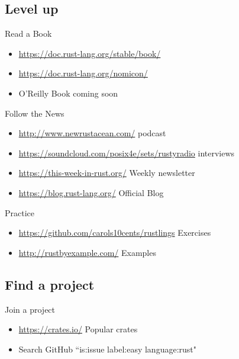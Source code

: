 \documentclass[50pt]{beamer}
\begin{document}
\subsection{Level up}

    \begin{frame}
        Read a Book
        \begin{itemize}
            \item \url{https://doc.rust-lang.org/stable/book/}
            \item \url{https://doc.rust-lang.org/nomicon/}
            \item O'Reilly Book coming soon
        \end{itemize}
    \end{frame}

    \begin{frame}
        Follow the News
        \begin{itemize}
            \item \url{http://www.newrustacean.com/} podcast
            \item \url{https://soundcloud.com/posix4e/sets/rustyradio} interviews
            \item \url{https://this-week-in-rust.org/} Weekly newsletter
            \item \url{https://blog.rust-lang.org/} Official Blog
        \end{itemize}
    \end{frame}

    \begin{frame}
        Practice
        \begin{itemize}
            \item \url{https://github.com/carols10cents/rustlings} Exercises
            \item \url{http://rustbyexample.com/} Examples
        \end{itemize}
    \end{frame}

\subsection{Find a project}

    \begin{frame}
        Join a project
        \begin{itemize}
            \item \url{https://crates.io/} Popular crates
            \item Search GitHub ``is:issue label:easy language:rust"
        \end{itemize}
    \end{frame}
\end{document}
